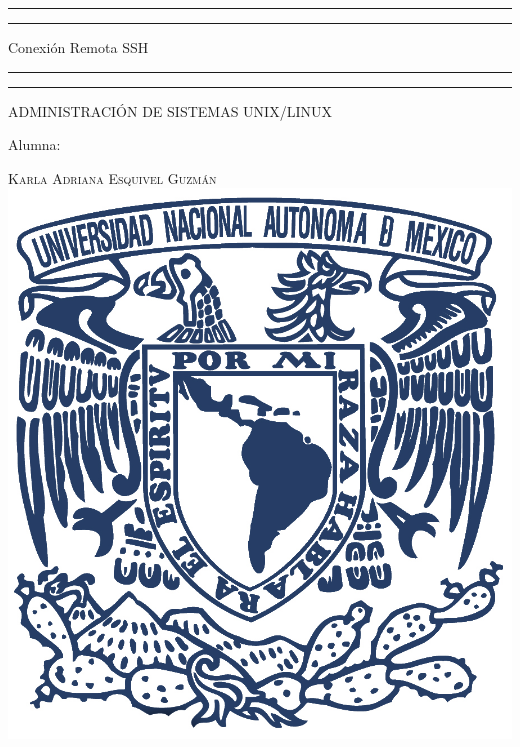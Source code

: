 \documentclass[a4paper, 11pt, oneside]{article}
\begin{document}
 

\begin{titlepage} 

	\centering 
	
	\scshape 
	
	\vspace*{\baselineskip} 
	
	
	
	\rule{\textwidth}{1.6pt}\vspace*{-\baselineskip}\vspace*{2pt} 
	\rule{\textwidth}{0.4pt} 
	
	\vspace{0.75\baselineskip} 
	
	{\LARGE Conexión Remota SSH}	
	\vspace{0.75\baselineskip} 
	
	\rule{\textwidth}{0.4pt}\vspace*{-\baselineskip}\vspace{3.2pt}
	\rule{\textwidth}{1.6pt} 
	
	\vspace{2\baselineskip} 
	

	ADMINISTRACIÓN DE SISTEMAS UNIX/LINUX
	
	\vspace*{3\baselineskip} 
	
	
	
	Alumna:
	
	\vspace{0.5\baselineskip} 
	
	{\scshape\Large Karla Adriana Esquivel Guzmán \\} 
	\vspace{0.5\baselineskip} 
	\vfill
	\includegraphics{unam.jpg}
	

\end{titlepage}
\end{document}
